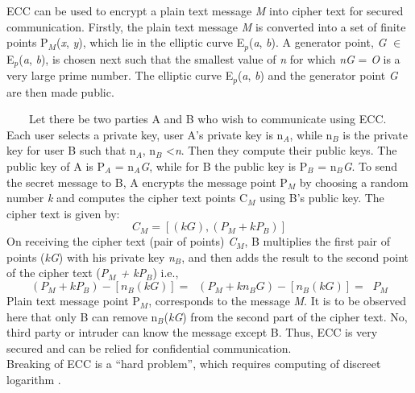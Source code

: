 \documentclass[preprint,12pt]{elsarticle}
\begin{document}
ECC can be used to encrypt a plain text message \emph{M} into cipher text for secured communication. Firstly, the plain text message \emph{M} is converted into a set of finite points  P$_{M}$(\emph{x}, \emph{y}), which lie in the elliptic curve E$_{p}$(\emph{a}, \emph{b}). A generator point, \emph{G} $\in$ E$_{p}$(\emph{a}, \emph{b}), is chosen next such that the smallest value of \emph{n} for which \emph{n}\emph{G} = \emph{O} is a very large prime number. The elliptic curve E$_{p}$(\emph{a}, \emph{b}) and the generator point \emph{G} are then made public.

\ \ \ \ Let there be two parties A and B who wish to communicate using ECC.  Each user selects a private key, user A's private key is n$_{A}$, while n$_{B}$ is the private key for user B such that n$_{A}$, n$_{B}$  \textless \emph{n}. Then they compute their public keys. The public key  of A is P$_{A}$ =  n$_{A}$\emph{G}, while for B the public key  is P$_{B}$ =  n$_{B}$\emph{G}. To send the secret message to B, A encrypts the message point P$_{M}$  by choosing a random number \emph{k} and computes the cipher text points  C$_{M}$ using B's public key. The cipher text is given by:
\begin{equation}
C_{M} = [(kG), (P_{M} + kP_{B})] 
\label{ciphertext}
\end{equation} 
On receiving the cipher text (pair of points) \emph{C$_{M}$}, B multiplies the first pair of points (\emph{k}\emph{G}) with his private key \emph{n$_{B}$}, and then adds the result to the second point of the cipher text (\emph{P$_{M}$ + kP$_{B}$}) i.e.,
\begin{equation}
(P_{M} + kP_{B}) - [n_{B}(kG)] = \;\;(P_{M} + kn_{B}G) - [n_{B}(kG)] = \;\;P_{M}
\label{palintext}
\end{equation} 
Plain text message point P$_{M}$, corresponds to the message \emph{M}. It is to be observed here that only B can remove n$_{B}$(\emph{k}\emph{G}) from the second part of the cipher text. No, third party or intruder can know the message except B. Thus, ECC is very secured and can be relied for confidential communication.\\
Breaking of ECC is a ``hard problem'', which requires computing of discreet logarithm \cite{stalling}. 
\end{document}
